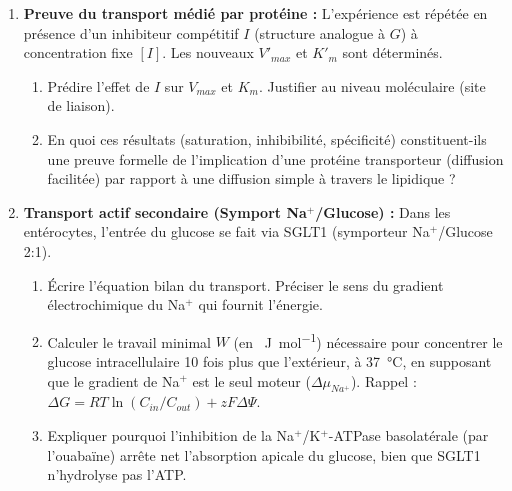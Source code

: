 \documentclass[11pt]{article}
\begin{document}
\begin{exercice}
\begin{enumerate}
\begin{enumerate}
    \end{enumerate}
    \item \textbf{Preuve du transport médié par protéine :} L'expérience est répétée en présence d'un inhibiteur compétitif $I$ (structure analogue à $G$) à concentration fixe $[I]$. Les nouveaux $V'_{max}$ et $K'_m$ sont déterminés. 
    \begin{enumerate}
        \item Prédire l'effet de $I$ sur $V_{max}$ et $K_m$. Justifier au niveau moléculaire (site de liaison).
        \item En quoi ces résultats (saturation, inhibibilité, spécificité) constituent-ils une preuve formelle de l'implication d'une protéine transporteur (diffusion facilitée) par rapport à une diffusion simple à travers le lipidique ?
    \end{enumerate}
    \item \textbf{Transport actif secondaire (Symport Na$^+$/Glucose) :} Dans les entérocytes, l'entrée du glucose se fait via SGLT1 (symporteur Na$^+$/Glucose 2:1). 
    \begin{enumerate}
        \item Écrire l'équation bilan du transport. Préciser le sens du gradient électrochimique du Na$^+$ qui fournit l'énergie.
        \item Calculer le travail minimal $W$ (en \SI{}{J.mol^{-1}}) nécessaire pour concentrer le glucose intracellulaire 10 fois plus que l'extérieur, à \SI{37}{\celsius}, en supposant que le gradient de Na$^+$ est le seul moteur ($\Delta \mu_{Na^+}$). Rappel : $\Delta G = RT \ln(C_{in}/C_{out}) + zF\Delta\Psi$.
        \item Expliquer pourquoi l'inhibition de la Na$^+$/K$^+$-ATPase basolatérale (par l'ouabaïne) arrête net l'absorption apicale du glucose, bien que SGLT1 n'hydrolyse pas l'ATP.
    \end{enumerate}
\end{enumerate}
\end{exercice}
\end{document}
